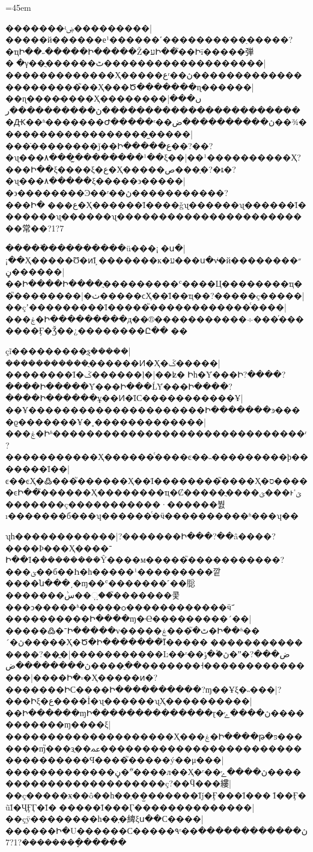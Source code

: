 \documentclass[12pt]{article}
\begin{document}
\vfil
\newfontfamily{}
\newfontfamily{}
\setgezhuraise{-3.5pt}
\gezhuraggedtrue
\gezhunormalizetrue
\hsize=45em
\begin{withgezhu}

�������ʵۻ���������|{�����й������е¹������˹����������ַ�����?�ҵԻ��˶�����Ի�����Ž�עԻ��֮��Իï�����弾�ֵ�֮�γ��ֲ������ٹ���������}����������|{�������������Ҳ�����عʳ��ڽ���������������}�������֮��Ҳ���Ծ�������ɳ������|{��ɳ����̶����Ҳ}��������ں���|{�����������������������ڽ����������ر�Ԫ��ʱ�������Ժ�����ʳ��ڽ����������ض��¾�����������}��������̫����|{���ֿ��������ǰ��Ի�����ع��?��?�ʯ���۸���̫��}������¹��ξ��|{��¹����������Ҳ?���Ի��ξ����ξ�ع�Ҳ�����ص���ְ�?�ȶ�?�ʯ���۸�����ξ}�����϶�����|{�϶��������Ͽ��ʳ��ڽ�����������?���Ի����ع�Ҳ������Ϊ����ǧʯ������ʯ������Ϊ�������ʯ������ʯ}������������������������常��?1?7

�����߳���������ü���¡׼�ս�|{¡��Ҳ�����Ʊ�ͷΪ׼֣�������к�ע���ս�νͥ�й���״����}�����ڼ��|{��Ի����Ի�}���ֲ���������ʿ����Ц��������ҵ��֮��������|{�ٺ�����ϲҲ��Ϊ��ҵ��?���}��ç�����|{��çʼ���������Ϊ���}��֮������������ͨ����|{���ۼ�Ի���������д��®�����������÷���ͬ�������Ӻ�Ǯ��¿��������Ը����}

çĩ���������ֻȿܵ�����|{�����������ֻ������Ͷ�Ҳ}�ػ�����|{��������Ϊ�ػ�}�����ļ�|{��ʫ�⴫Իһ�Ȳ���Ի?����?����Ի�����Ȳ���Ի���ĹȲ���Ի����?����Ի����}��ұ��Ͷ�ΪС�����������Ұ|{��Ұ���������������������Ի�������ͽ����ϱ�������Ұ�˳���}����������|{���ۼ�Իʱ������������������������������ʳ?�����������Ҳ}������ͨ����ͼ��˵���������ϸ�������Ϊ��|{ͼ��ͼҲ�߷���֮������Ҳ��Ϊ��������֮����Ҳ�ס�����ͼԻ��֮������Ҳ}��������ҵ�Ȼ�����ֲ����ؽ���ͱؾٴ�������ç�����������·������붨ı�������б���ʮ������ͨ�ӵ����������ʱ���ʮ��

ʮһ������������|{?�������Ի���?��â����?����Ϸ���Ҳ����־Ի��Ϊ�ܵ��������Ŷ����м�����֮�����������?���ؽ��б��Һ�һ�����¹���������깥����ն���͵�ɱ��ʿ�������˹��䶼�������ܵس��಼��֮��}�����콫���ͻ�����ʱ�����ѻ������������ӵܿ־����������Ի����ɱ�Ҽ���������´��|{�����߷�־Ի�����ν�����ٹ�֮���ۼ�Ի��ʱ��´�ڽ�����Ҳ}�Ծ�Ի�������ิΪ֮�����԰���������������?��ֱ�|{�����������Ŀ��ʳ��ڽ�۫�ݸ�ˮ�ض���?��ֵ����ڽ��������ض���}����˧���������������|{����Ի�۾�Ҳ�����ͷ�?�������ԻС����Ի��}��������?ɱ��Ұξ�˵���|{?���Իξ�ع����İ�ʯ������ʯҲ}����������|{��Ի������ɱԻ��������������ɽ�ڽ����ݺ���������}��ɱ����ξ|{��������������������Ҳ���ۼ�Ի����թ�ƽ�������ɱ֮}���зֲ��ﲻ����������������������������������Ϥ����֮�����ý��μ���|{�������������ڼ�ˮ֮����л��Ҳ�ʳ��ڽ����ݺ�������������������}����ç?��Ӵ���縷|{��ç�����ӿ��ô��һ��ְ��̫������Ϊǰ�Ӻ���Ϊ���򣴨Ϊ��Ӻ�ũΪ�ҶӺӶ�Ϊ�׶�����Ϊ���Ӷ�����}���������|{��çÿ��������һ��ְ�綼ξ}ս��С����|{������Ի�U������С�����۹ʳ��ڽ������������}������ܻ�������?1?7
\end{withgezhu}
\end{document}
